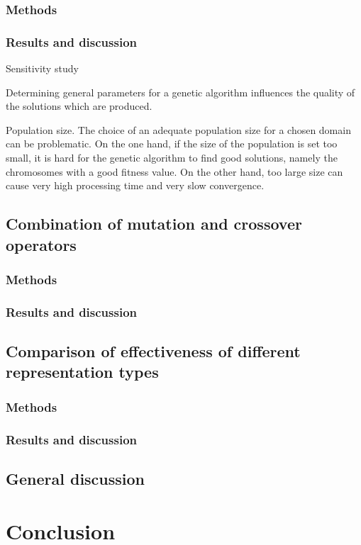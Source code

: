 \documentclass[a4paper, 12pt, headings=standardclasses]{scrartcl}
\begin{document}
\subsubsection{Methods}
\subsubsection{Results and discussion}
Sensitivity study

Determining general parameters for a genetic algorithm  influences the quality of the solutions which are produced. 

Population size. 
The choice of an adequate population size for a chosen domain can be problematic. On the one hand, if the size of the population is set too small, it is hard for the genetic algorithm to find good solutions, namely the chromosomes with a good fitness value. On the other hand, too large size can cause very high processing time and very slow convergence. 

\subsection{Combination of mutation and crossover operators}
\subsubsection{Methods}
\subsubsection{Results and discussion}

\subsection{Comparison of effectiveness of different representation types}
\subsubsection{Methods}
\subsubsection{Results and discussion}

\subsection{General discussion}

\section{Conclusion}




\newpage

\newpage
{}



\end{document}
